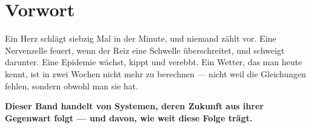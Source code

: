 \chapter*{Vorwort}

\begin{merksatz}
Ein Herz schlägt siebzig Mal in der Minute, und niemand zählt vor. Eine Nervenzelle feuert, wenn der Reiz eine Schwelle überschreitet, und schweigt darunter. Eine Epidemie wächst, kippt und verebbt. Ein Wetter, das man heute kennt, ist in zwei Wochen nicht mehr zu berechnen --- nicht weil die Gleichungen fehlen, sondern obwohl man sie hat.

\begin{center}
\begin{minipage}{0.9\textwidth}
\textbf{Dieser Band handelt von Systemen, deren Zukunft aus ihrer Gegenwart folgt --- und davon, wie weit diese Folge trägt.}
\end{minipage}
\end{center}

\begin{center}
\begin{minipage}{0.88\textwidth}
\end{minipage}
\end{center}
\end{merksatz}

